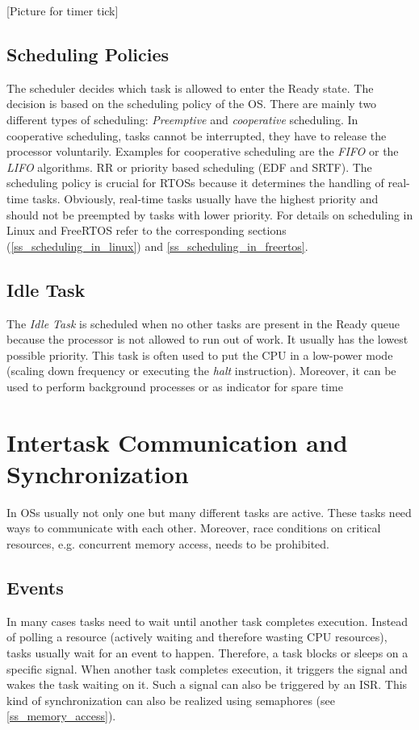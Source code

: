[Picture for timer tick] 

\subsection{Scheduling Policies}\label{ss_scheduling_policy} 
The scheduler decides which task is allowed to enter the Ready state. 
The decision is based on the scheduling policy of the \ac{OS}.
There are mainly two different types of scheduling: \textit{Preemptive} and \textit{cooperative} scheduling.
In cooperative scheduling, tasks cannot be interrupted, they have to release the processor voluntarily. 
Examples for cooperative scheduling are the \textit{\ac{FIFO}} or the \textit{\ac{LIFO}} algorithms.
\ac{RR} or priority based scheduling (\ac{EDF} and \ac{SRTF}).
The scheduling policy is crucial for \acp{RTOS} because it determines the handling of real-time tasks.
Obviously, real-time tasks usually have the highest priority and should not be preempted by tasks with lower priority.
For details on scheduling in Linux and FreeRTOS refer to the corresponding sections (\ref{ss_scheduling_in_linux}) and \ref{ss_scheduling_in_freertos}.

\subsection{Idle Task}
The \textit{Idle Task} is scheduled when no other tasks are present in the Ready queue because the processor is not allowed to run out of work.
It usually has the lowest possible priority.
This task is often used to put the \ac{CPU} in a low-power mode (scaling down frequency or executing the \textit{halt} instruction). 
Moreover, it can be used to perform background processes or as indicator for spare time  
 
\section{Intertask Communication and Synchronization}\label{s_intertask_communication}
In \acp{OS} usually not only one but many different tasks are active.
These tasks need ways to communicate with each other.
Moreover, race conditions on critical resources, e.g. concurrent memory access, needs to be prohibited.

\subsection{Events}
In many cases tasks need to wait until another task completes execution.
Instead of polling a resource (actively waiting and therefore wasting \ac{CPU} resources), tasks usually wait for an event to happen.
Therefore, a task blocks or sleeps on a specific signal.
When another task completes execution, it triggers the signal and wakes the task waiting on it.
Such a signal can also be triggered by an \ac{ISR}.
This kind of synchronization can also be realized using semaphores (see \ref{ss_memory_access}).

